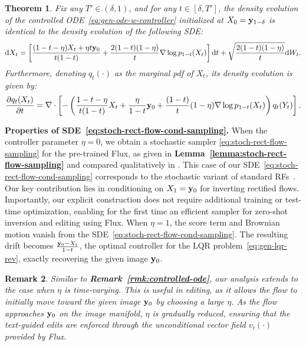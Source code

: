 \documentclass{article} %
\theoremstyle{plain}
\newtheorem{theorem}{Theorem}[section]
\newtheorem{remark}[theorem]{Remark}
\newcommand{\deriv}{\mathrm{d}}
\begin{document}
\begin{theorem}
\label{theorem:sde-equiv-cntrl-gen-ode}
Fix any $T' \in (\delta,1)$, and for any $t \in [\delta, T']$, the density evolution of the controlled ODE~\eqref{eq:gen-ode-w-controller} initialized at $X_0 = {\mathbf{y}}_{1-\delta}$ is identical to the density evolution of the following SDE:
\begin{align}
    \label{eq:stoch-rect-flow-cond-sampling}
    \deriv X_t = \left[\frac{(1-t-\eta)X_t+\eta t \rvy_0}{t(1-t)} + \frac{2(1-t)(1-\eta)}{t}  \nabla \log p_{1-t}(X_t) \right] \deriv t + \sqrt{\frac{2(1-t)(1-\eta)}{t}}  \deriv W_t.
\end{align}
Furthermore, denoting $q_t(\cdot)$ as the marginal pdf of $X_t$, its density evolution is given by: 
\begin{align}
    \frac{\partial q_t(X_t)}{\partial t} = \nabla \cdot \left[-\left(\frac{1-t-\eta}{t(1-t)}X_t +  \frac{\eta}{1-t}{\mathbf{y}}_0 + \frac{(1-t)}{t} (1-\eta) \nabla \log p_{1-t}(X_t)\right)q_t(Y_t)\right].
\end{align}
\end{theorem}

\noindent\textbf{Properties of SDE~\eqref{eq:stoch-rect-flow-cond-sampling}.}
When the controller parameter $\eta = 0$, we obtain a stochastic sampler \eqref{eq:stoch-rect-flow-sampling} for the pre-trained Flux, as given in \textbf{Lemma~\ref{lemma:stoch-rect-flow-sampling}} and compared qualitatively in .
This case of our SDE~\eqref{eq:stoch-rect-flow-cond-sampling} corresponds to the stochastic variant of standard RFs~\citep{rectflow,lipman2022flow,interpolant}.
Our key contribution lies in conditioning on $X_1={\mathbf{y}}_0$ for inverting rectified flows. 
Importantly, our explicit construction does not require additional training or test-time optimization, enabling
for the first time an efficient sampler for zero-shot inversion and editing using Flux.
When $\eta = 1$, the score term and Brownian motion vanish from the SDE~\eqref{eq:stoch-rect-flow-cond-sampling}. The resulting drift becomes $\frac{{\mathbf{y}}_0 - X_t}{1-t}$, the optimal controller for the LQR problem~\eqref{eq:gen-lqr-rev}, exactly recovering the given image ${\mathbf{y}}_0$. 


\begin{remark}
\label{rmk:controlled-sde}
Similar to \textbf{Remark~\ref{rmk:controlled-ode}}, our analysis extends to the case when $\eta$ is time-varying.
This is useful in editing, as it allows the flow to initially move toward the given image ${\mathbf{y}}_0$ by choosing a large $\eta$. 
As the flow approaches ${\mathbf{y}}_0$ on the image manifold, $\eta$ is gradually reduced, ensuring that the text-guided edits are enforced through the unconditional vector field $v_t(\cdot)$ provided by Flux.
\end{remark}
\end{document}
